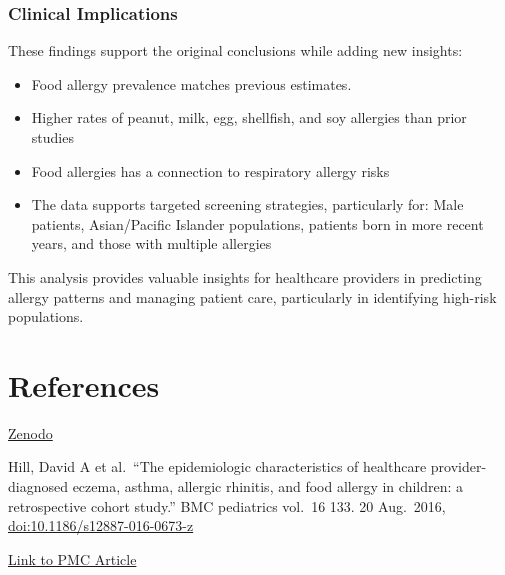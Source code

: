 \documentclass[
]{article}
\providecommand{\tightlist}{%
  \setlength{\itemsep}{0pt}\setlength{\parskip}{0pt}}
\begin{document}
\subsubsection{Clinical Implications}\label{clinical-implications}

These findings support the original conclusions while adding new
insights:

\begin{itemize}
\tightlist
\item
  Food allergy prevalence matches previous estimates.
\item
  Higher rates of peanut, milk, egg, shellfish, and soy allergies than
  prior studies
\item
  Food allergies has a connection to respiratory allergy risks
\item
  The data supports targeted screening strategies, particularly for:
  Male patients, Asian/Pacific Islander populations, patients born in
  more recent years, and those with multiple allergies
\end{itemize}

This analysis provides valuable insights for healthcare providers in
predicting allergy patterns and managing patient care, particularly in
identifying high-risk populations.

\section{References}\label{references}

\href{https://zenodo.org/records/44529}{Zenodo}

Hill, David A et al.~``The epidemiologic characteristics of healthcare
provider-diagnosed eczema, asthma, allergic rhinitis, and food allergy
in children: a retrospective cohort study.'' BMC pediatrics vol.~16 133.
20 Aug.~2016, \url{doi:10.1186/s12887-016-0673-z}

\href{https://pmc.ncbi.nlm.nih.gov/articles/PMC4992234/}{Link to PMC
Article}
\end{document}
